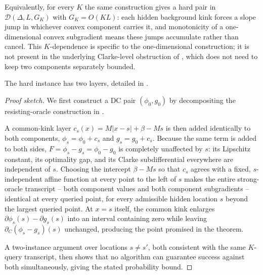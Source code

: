 \begin{remark}
\label{rmk:GK-tradeoff}
Equivalently, for every $K$ the same construction gives a hard pair in $\mathcal D(\Delta,L,G_K)$ with $G_K=O(KL)$: each hidden background kink forces a slope jump in whichever convex component carries it, and monotonicity of a one-dimensional convex subgradient means these jumps accumulate rather than cancel. This $K$-dependence is specific to the one-dimensional construction; it is not present in the underlying Clarke-level obstruction of \citet{Zhang-2020-Complexity}, which does not need to keep two components separately bounded. 
\end{remark}
The hard instance has two layers, detailed in
.
\begin{proof}[Proof sketch]
We first construct a DC pair $(\phi_0,g_0)$ by decompositing the 
resisting-oracle construction in \citet{Zhang-2020-Complexity}.

A common-kink layer $c_s(x)=M|x-s|+\beta-Ms$ is then added identically to
both components, $\phi_s=\phi_0+c_s$ and $g_s=g_0+c_s$. Because the same
term is added to both sides, $F=\phi_s-g_s=\phi_0-g_0$ is completely
unaffected by $s$: its Lipschitz constant, its optimality gap, and its
Clarke subdifferential everywhere are independent of $s$. Choosing the
intercept $\beta-Ms$ so that $c_s$ agrees with a fixed, $s$-independent
affine function at every point to the left of $s$ makes the entire
strong-oracle transcript -- both component values and both component
subgradients -- identical at every queried point, for every admissible
hidden location $s$ beyond the largest queried point. At $x=s$ itself,
the common kink enlarges $\partial\phi_s(s)-\partial g_s(s)$ into an
interval containing zero while leaving $\partial_C(\phi_s-g_s)(s)$
unchanged, producing the point promised in the theorem.

A two-instance argument over locations $s\neq s'$, both consistent with
the same $K$-query transcript, then shows that no algorithm can
guarantee success against both simultaneously, giving the stated
probability bound.
\end{proof}

